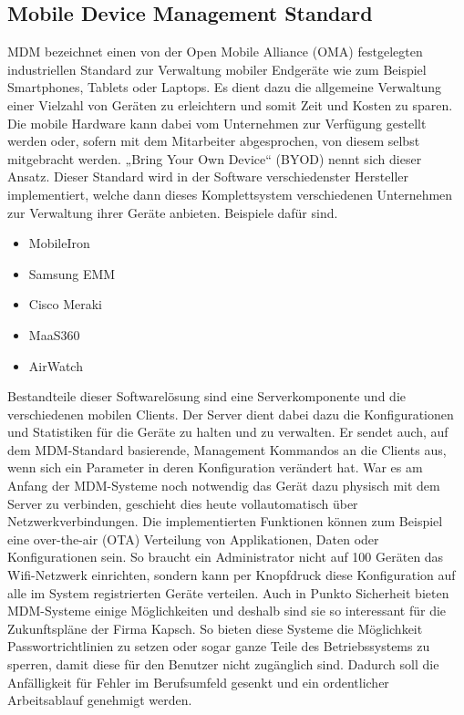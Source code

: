 \subsection{Mobile Device Management Standard}
MDM bezeichnet einen von der Open Mobile Alliance (OMA) festgelegten industriellen Standard zur Verwaltung mobiler Endgeräte wie zum Beispiel Smartphones, Tablets oder Laptops. Es dient dazu die allgemeine Verwaltung einer Vielzahl von Geräten zu erleichtern und somit Zeit und Kosten zu sparen. Die mobile Hardware kann dabei vom Unternehmen zur Verfügung gestellt werden oder, sofern mit dem Mitarbeiter abgesprochen, von diesem selbst mitgebracht werden. „Bring Your Own Device“ (BYOD) nennt sich dieser Ansatz. Dieser Standard wird in der Software verschiedenster Hersteller implementiert, welche dann dieses Komplettsystem verschiedenen Unternehmen zur Verwaltung ihrer Geräte anbieten. Beispiele dafür sind.
\begin{itemize}
	\item MobileIron
	\item Samsung EMM
	\item Cisco Meraki
	\item MaaS360
	\item AirWatch
\end{itemize}
Bestandteile dieser Softwarelösung sind eine Serverkomponente und die verschiedenen mobilen Clients. Der Server dient dabei dazu die Konfigurationen und Statistiken für die Geräte zu halten und zu verwalten. Er sendet auch, auf dem MDM-Standard basierende, Management Kommandos an die Clients aus, wenn sich ein Parameter in deren Konfiguration verändert hat. War es am Anfang der MDM-Systeme noch notwendig das Gerät dazu physisch mit dem Server zu verbinden, geschieht dies heute vollautomatisch über Netzwerkverbindungen. Die implementierten Funktionen können zum Beispiel eine over-the-air (OTA) Verteilung von Applikationen, Daten oder Konfigurationen sein. So braucht ein Administrator nicht auf 100 Geräten das Wifi-Netzwerk einrichten, sondern kann per Knopfdruck diese Konfiguration auf alle im System registrierten Geräte verteilen.  Auch in Punkto Sicherheit bieten MDM-Systeme einige Möglichkeiten und deshalb sind sie so interessant für die Zukunftspläne der Firma Kapsch. So bieten diese Systeme die Möglichkeit Passwortrichtlinien zu setzen oder sogar ganze Teile des Betriebssystems zu sperren, damit diese für den Benutzer nicht zugänglich sind. Dadurch soll die Anfälligkeit für Fehler im Berufsumfeld gesenkt und ein ordentlicher Arbeitsablauf genehmigt werden.
